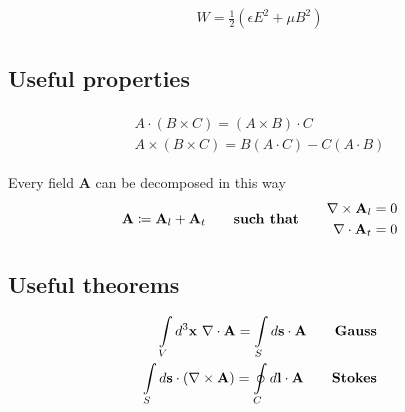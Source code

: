 \documentclass[a4paper, twocolumn]{article}
\begin{document}
\begin{gather}
  \label{eq:59}
  \begin{split}
    W=\frac{1}{2}(\epsilon E^2+\mu B^2)
  \end{split}
\end{gather}

\subsection{Useful properties}
\label{sec:useful-properties}
\begin{gather}
  \label{eq:37}
  \begin{split}
    A\cdot(B\times C)=(A\times B)\cdot C \\
    A\times(B\times C)=B(A\cdot C)-C(A\cdot B)
  \end{split}
\end{gather}

Every field $\mathbf{A}$ can be decomposed in this way
\begin{align*}
  \begin{aligned}
    \mathbf{A}\coloneqq\mathbf{A}_l+\mathbf{A}_t \\
  \end{aligned}
  \qquad \text{\textbf{such that}}\qquad 
  \begin{aligned}
    \nabla\times\mathbf{A}_l=0 \\
    \nabla\cdot\mathbf{A}_t =0\\
  \end{aligned}
\end{align*}

\subsection{Useful theorems}
\label{sec:useful-theorems}

\begin{gather}
  \label{eq:38}
  \begin{split}
    \int \displaylimits_V d^3\textbf{x}~ \nabla\cdot\mathbf{A}=\int\displaylimits_S d\mathbf{s}\cdot \mathbf{A} \qquad   \text{\textbf{Gauss}} \\
    \int\displaylimits_S d\mathbf{s}\cdot(\nabla\times \mathbf{A})=\oint\displaylimits_C d\mathbf{l}\cdot\mathbf{A} \qquad \text{\textbf{Stokes}}
  \end{split} 
\end{gather}
\end{document}
